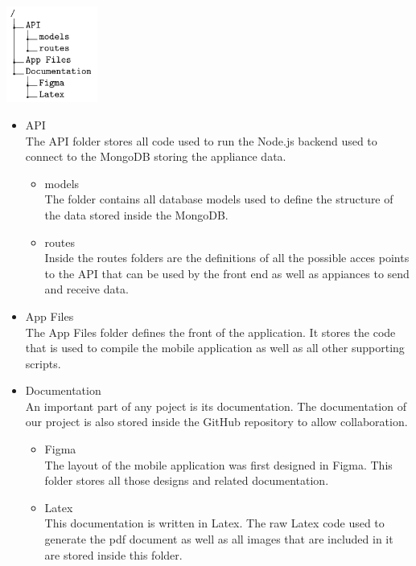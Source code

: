 \documentclass[10pt]{article}
\begin{document}
\begin{multicols*}{2}
\begin{enumerate}
  \begin{center}
    \includegraphics[max width=3cm]{repoTree}
  \end{center}

  \begin{itemize}
    \item {API} \\
    The API folder stores all code used to run the Node.js backend used to connect to the MongoDB storing the appliance data.
    \begin{itemize}
      \item {models} \\
      The folder contains all database models used to define the structure of the data stored inside the MongoDB.
      \item {routes} \\
      Inside the routes folders are the definitions of all the possible acces points to the API that can be used by the front end as well as appiances to send and receive data.
    \end{itemize}
    \item {App Files} \\
    The App Files folder defines the front of the application. It stores the code that is used to compile the mobile application as well as all other supporting scripts.
    \item {Documentation} \\
    An important part of any poject is its documentation. The documentation of our project is also stored inside the GitHub repository to allow collaboration.
    \begin{itemize}
      \item {Figma} \\
      The layout of the mobile application was first designed in Figma. This folder stores all those designs and related documentation.
      \item {Latex} \\
      This documentation is written in Latex. The raw Latex code used to generate the pdf document as well as all images that are included in it are stored inside this folder.
    \end{itemize}
  \end{itemize}


\end{enumerate}
\end{multicols*}
\end{document}
